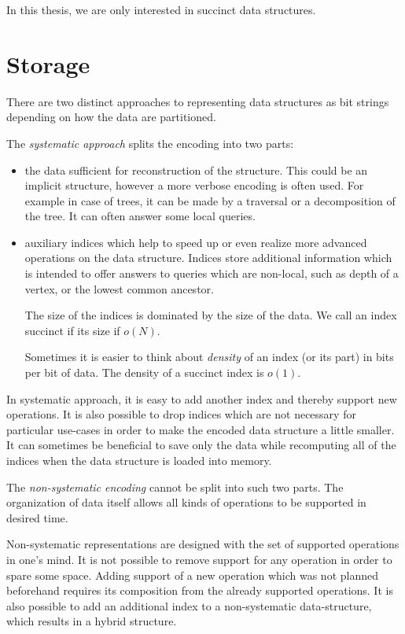 \bigbreak

In this thesis, we are only interested in succinct data structures.

\section{Storage}

There are two distinct approaches to representing data structures as bit strings depending on how the data are partitioned.

The \emph{systematic approach} splits the encoding into two parts:
\begin{itemize}
	\item the data sufficient for reconstruction of the structure.
	This could be an implicit structure, however a more verbose encoding is often used.
	For example in case of trees, it can be made by a traversal or a decomposition of the tree.
	It can often answer some local queries.
	\item auxiliary indices which help to speed up or even realize more advanced operations on the data structure.
	Indices store additional information which is intended to offer answers to queries which are non-local, such as depth of a vertex, or the lowest common ancestor.

	The size of the indices is dominated by the size of the data.	
	We call an index succinct if its size if $o(N)$.
	
	Sometimes it is easier to think about \emph{density} of an index (or its part) in bits per bit of data.
	The density of a succinct index is $o(1)$.
\end{itemize}

In systematic approach, it is easy to add another index and thereby support new operations.
It is also possible to drop indices which are not necessary for particular use-cases in order to make the encoded data structure a little smaller.
It can sometimes be beneficial to save only the data while recomputing all of the indices when the data structure is loaded into memory.

\bigbreak

The \emph{non-systematic encoding} cannot be split into such two parts.
The organization of data itself allows all kinds of operations to be supported in desired time.

Non-systematic representations are designed with the set of supported operations in one's mind.
It is not possible to remove support for any operation in order to spare some space.
Adding support of a new operation which was not planned beforehand requires its composition from the already supported operations.
It is also possible to add an additional index to a non-systematic data-structure, which results in a hybrid structure.

